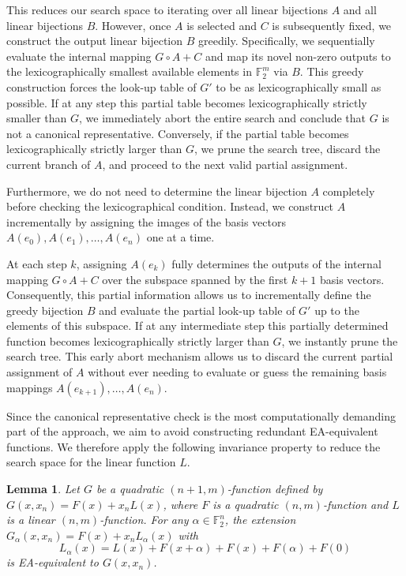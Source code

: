 \documentclass{amsart}[11pt]
\theoremstyle{plain}
\newtheorem{lemma}[theorem]{Lemma}
\theoremstyle{definition}
\numberwithin{theorem}{section}
\numberwithin{equation}{section}
\numberwithin{table}{section}
\numberwithin{figure}{section}
\numberwithin{algorithm}{section}
\def\F{\mathbb F}
\begin{document}
This reduces our search space to iterating over all linear bijections $A$ and all linear bijections $B$.
However, once $A$ is selected and $C$ is subsequently fixed, we construct the output linear bijection $B$ greedily.
Specifically, we sequentially evaluate the internal mapping $G \circ A + C$ and map its novel non-zero outputs to the lexicographically smallest available elements in $\F_2^m$ via $B$.
This greedy construction forces the look-up table of $G'$ to be as lexicographically small as possible.
If at any step this partial table becomes lexicographically strictly smaller than $G$, we immediately abort the entire search and conclude that $G$ is not a canonical representative.
Conversely, if the partial table becomes lexicographically strictly larger than $G$, we prune the search tree, discard the current branch of $A$, and proceed to the next valid partial assignment.

Furthermore, we do not need to determine the linear bijection $A$ completely before checking the lexicographical condition.
Instead, we construct $A$ incrementally by assigning the images of the basis vectors $A(e_0), A(e_1), \dots, A(e_n)$ one at a time.

At each step $k$, assigning $A(e_k)$ fully determines the outputs of the internal mapping $G \circ A + C$ over the subspace spanned by the first $k+1$ basis vectors.
Consequently, this partial information allows us to incrementally define the greedy bijection $B$ and evaluate the partial look-up table of $G'$ up to the elements of this subspace.
If at any intermediate step this partially determined function becomes lexicographically strictly larger than $G$, we instantly prune the search tree.
This early abort mechanism allows us to discard the current partial assignment of $A$ without ever needing to evaluate or guess the remaining basis mappings $A(e_{k+1}), \dots, A(e_n)$.

Since the canonical representative check is the most computationally demanding part of the approach, we aim to avoid constructing redundant EA-equivalent functions.
We therefore apply the following invariance property to reduce the search space for the linear function $L$.

\begin{lemma}
	Let $G$ be a quadratic $(n+1,m)$-function defined by $G(x, x_n) = F(x) + x_n L(x)$, where $F$ is a quadratic $(n,m)$-function and $L$ is a linear $(n,m)$-function.
	For any $\alpha \in \F_2^n$, the extension $G_{\alpha}(x, x_n) = F(x) + x_n L_{\alpha}(x)$ with
	$$ L_{\alpha}(x) = L(x) + F(x+\alpha) + F(x) + F(\alpha) + F(0) $$
	is EA-equivalent to $G(x, x_n)$.
\end{lemma}
\end{document}
